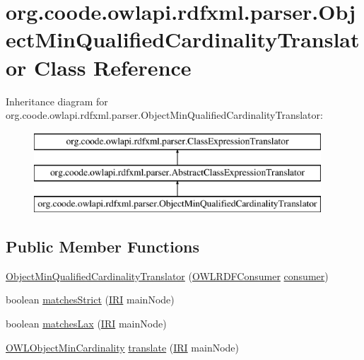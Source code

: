 \hypertarget{classorg_1_1coode_1_1owlapi_1_1rdfxml_1_1parser_1_1_object_min_qualified_cardinality_translator}{\section{org.\-coode.\-owlapi.\-rdfxml.\-parser.\-Object\-Min\-Qualified\-Cardinality\-Translator Class Reference}
\label{classorg_1_1coode_1_1owlapi_1_1rdfxml_1_1parser_1_1_object_min_qualified_cardinality_translator}
}
Inheritance diagram for org.\-coode.\-owlapi.\-rdfxml.\-parser.\-Object\-Min\-Qualified\-Cardinality\-Translator\-:\begin{figure}[H]
\begin{center}
\leavevmode
\includegraphics[height=3.000000cm]{classorg_1_1coode_1_1owlapi_1_1rdfxml_1_1parser_1_1_object_min_qualified_cardinality_translator}
\end{center}
\end{figure}
\subsection*{Public Member Functions}
\begin{DoxyCompactItemize}
\item 
\hyperlink{classorg_1_1coode_1_1owlapi_1_1rdfxml_1_1parser_1_1_object_min_qualified_cardinality_translator_aeef7688c577b2c250a057ddeb011e8b3}{Object\-Min\-Qualified\-Cardinality\-Translator} (\hyperlink{classorg_1_1coode_1_1owlapi_1_1rdfxml_1_1parser_1_1_o_w_l_r_d_f_consumer}{O\-W\-L\-R\-D\-F\-Consumer} \hyperlink{classorg_1_1coode_1_1owlapi_1_1rdfxml_1_1parser_1_1_abstract_class_expression_translator_ae547084cdd5b92c03835b5aa404f823b}{consumer})
\item 
boolean \hyperlink{classorg_1_1coode_1_1owlapi_1_1rdfxml_1_1parser_1_1_object_min_qualified_cardinality_translator_a91a9dfb8f803dcc009a65f1cab296195}{matches\-Strict} (\hyperlink{classorg_1_1semanticweb_1_1owlapi_1_1model_1_1_i_r_i}{I\-R\-I} main\-Node)
\item 
boolean \hyperlink{classorg_1_1coode_1_1owlapi_1_1rdfxml_1_1parser_1_1_object_min_qualified_cardinality_translator_a95d92da5652b645746fe449be78ae31d}{matches\-Lax} (\hyperlink{classorg_1_1semanticweb_1_1owlapi_1_1model_1_1_i_r_i}{I\-R\-I} main\-Node)
\item 
\hyperlink{interfaceorg_1_1semanticweb_1_1owlapi_1_1model_1_1_o_w_l_object_min_cardinality}{O\-W\-L\-Object\-Min\-Cardinality} \hyperlink{classorg_1_1coode_1_1owlapi_1_1rdfxml_1_1parser_1_1_object_min_qualified_cardinality_translator_a1d9c8d23bbb6112985da8b78e9590a27}{translate} (\hyperlink{classorg_1_1semanticweb_1_1owlapi_1_1model_1_1_i_r_i}{I\-R\-I} main\-Node)
\end{DoxyCompactItemize}
